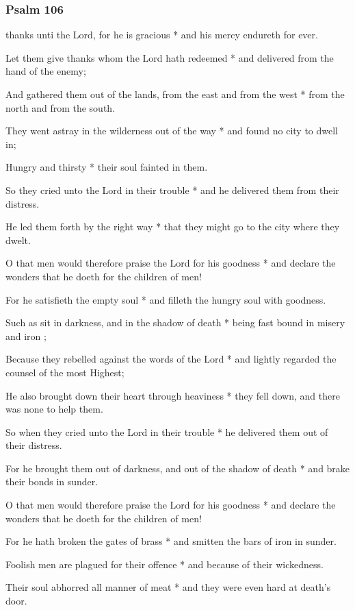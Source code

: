\subsubsection{Psalm 106}


 thanks unti the Lord, for he is gracious * and his mercy endureth for ever.

Let them give thanks whom the Lord hath redeemed * and delivered from the hand of the enemy;

And gathered them out of the lands, from the east and from the west * from the north and from the south.

They went astray in the wilderness out of the way * and found no city to dwell in;

Hungry and thirsty * their soul fainted in them.

So they cried unto the Lord in their trouble * and he delivered them from their distress.

He led them forth by the right way * that they might go to the city where they dwelt.

O that men would therefore praise the Lord for his goodness * and declare the wonders that he doeth for the children of men!

For he satisfieth the empty soul * and filleth the hungry soul with goodness.

Such as sit in darkness, and in the shadow of death * being fast bound in misery and iron ;

Because they rebelled against the words of the Lord * and lightly regarded the counsel of the most Highest;

He also brought down their heart through heaviness * they fell down, and there was none to help them.

So when they cried unto the Lord in their trouble * he delivered them out of their distress.

For he brought them out of darkness, and out of the shadow of death * and brake their bonds in sunder.

O that men would therefore praise the Lord for his goodness * and declare the wonders that he doeth for the children of men!

For he hath broken the gates of brass * and smitten the bars of iron in sunder.

Foolish men are plagued for their offence * and because of their wickedness.

Their soul abhorred all manner of meat * and they were even hard at death's door.


